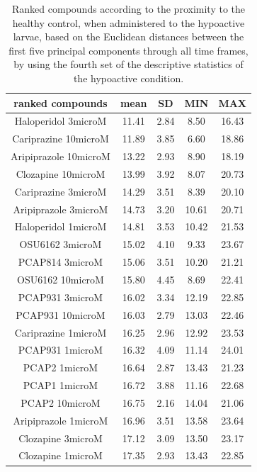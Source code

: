 \documentclass[a4paper,12pt]{article}
\begin{document}
\begin{table}[h!]\tiny
\centering
\caption{Ranked compounds according to the proximity to the healthy control, when administered to the hypoactive larvae, based on the Euclidean distances between the first five principal components through all time frames, by using the fourth set of the descriptive statistics of the hypoactive condition.}
\begin{tabular}{|c|c|c|c|c|}
\hline
ranked compounds             & mean & SD   & MIN  & MAX   \\ \hline
Haloperidol 3microM   & 11.41 & 2.84  & 8.50   & 16.43 \\ \hline
Cariprazine 10microM  & 11.89 & 3.85  & 6.60   & 18.86 \\ \hline
Aripiprazole 10microM & 13.22 & 2.93  & 8.90   & 18.19 \\ \hline
Clozapine 10microM    & 13.99 & 3.92  & 8.07  & 20.73 \\ \hline
Cariprazine 3microM   & 14.29 & 3.51  & 8.39  & 20.10  \\ \hline
Aripiprazole 3microM  & 14.73 & 3.20   & 10.61 & 20.71 \\ \hline
Haloperidol 1microM   & 14.81 & 3.53  & 10.42 & 21.53 \\ \hline
OSU6162 3microM       & 15.02 & 4.10   & 9.33  & 23.67 \\ \hline
PCAP814 3microM       & 15.06 & 3.51  & 10.20  & 21.21 \\ \hline
OSU6162 10microM      & 15.80  & 4.45  & 8.69  & 22.41 \\ \hline
PCAP931 3microM       & 16.02 & 3.34  & 12.19 & 22.85 \\ \hline
PCAP931 10microM      & 16.03 & 2.79  & 13.03 & 22.46 \\ \hline
Cariprazine 1microM   & 16.25 & 2.96  & 12.92 & 23.53 \\ \hline
PCAP931 1microM       & 16.32 & 4.09  & 11.14 & 24.01 \\ \hline
PCAP2 1microM         & 16.64 & 2.87  & 13.43 & 21.23 \\ \hline
PCAP1 1microM         & 16.72 & 3.88  & 11.16 & 22.68 \\ \hline
PCAP2 10microM        & 16.75 & 2.16  & 14.04 & 21.06 \\ \hline
Aripiprazole 1microM  & 16.96 & 3.51  & 13.58 & 23.64 \\ \hline
Clozapine 3microM     & 17.12 & 3.09  & 13.50  & 23.17 \\ \hline
Clozapine 1microM     & 17.35 & 2.93  & 13.43 & 22.85 \\ \hline

\end{tabular}
\end{table}
\end{document}
